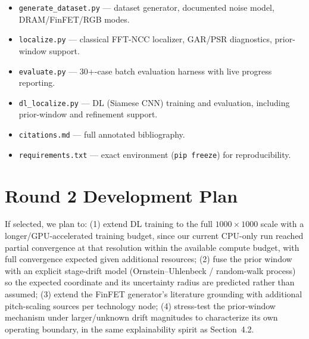 \documentclass[11pt]{article}
\begin{document}
\begin{itemize}
  \item \texttt{generate\_dataset.py} --- dataset generator, documented
    noise model, DRAM/FinFET/RGB modes.
  \item \texttt{localize.py} --- classical FFT-NCC localizer, GAR/PSR
    diagnostics, prior-window support.
  \item \texttt{evaluate.py} --- 30+-case batch evaluation harness with
    live progress reporting.
  \item \texttt{dl\_localize.py} --- DL (Siamese CNN) training and
    evaluation, including prior-window and refinement support.
  \item \texttt{citations.md} --- full annotated bibliography.
  \item \texttt{requirements.txt} --- exact environment (\texttt{pip
    freeze}) for reproducibility.
\end{itemize}

\section{Round 2 Development Plan}

If selected, we plan to: (1) extend DL training to the full $1000\times
1000$ scale with a longer/GPU-accelerated training budget, since our
current CPU-only run reached partial convergence at that resolution
within the available compute budget, with full convergence expected
given additional resources; (2) fuse the prior window with an explicit
stage-drift model (Ornstein--Uhlenbeck / random-walk process) so the
expected coordinate and its uncertainty radius are predicted rather than
assumed; (3) extend the FinFET generator's literature grounding with
additional pitch-scaling sources per technology node; (4) stress-test the
prior-window mechanism under larger/unknown drift magnitudes to
characterize its own operating boundary, in the same explainability
spirit as Section~4.2.
\end{document}
